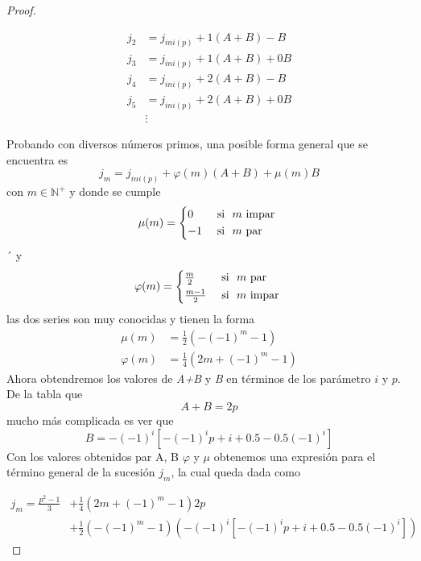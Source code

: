 \documentclass[10pt,letterpaper]{article}
\begin{document}
\begin{proof}
\begin{ejemplof2}[Caso p = 11]
\begin{align*}
	j_2 & =  j_{ini(p)} + 1(A  + B) - B  \\
	j_3 & =  j_{ini(p)} + 1(A + B) + 0B \\
	j_4 &=   j_{ini(p)} + 2(A + B) - B \\
	j_5 &=  j_{ini(p)}  + 2(A + B) + 0B  \\
	&\vdots 
\end{align*}
   	\end{ejemplof2}
  Probando con diversos números primos,  una posible forma general que se encuentra es
  \begin{equation}
  	j_m = j_{ini(p)} + \varphi(m)(A + B) + \mu(m) B
  \end{equation}
con $m \in \mathbb{N}^+$ y donde  se cumple 
\begin{equation*}
	\mu(m) = \begin{cases*}
		0 & \text{ si } $m$ impar \\
		-1 & \text{ si } $m$ par 
	\end{cases*}
\end{equation*}´
y 
\begin{equation*}
	\varphi(m) = \begin{cases*}
		\frac{m}{2} & \text{ si } $m$ par \\
		\frac{m - 1}{2} & \text{ si } $m$ impar 
	\end{cases*}
\end{equation*}
las dos series son muy conocidas y tienen la forma
\begin{align}
	\mu(m) &= \frac{1}{2}\left(-(-1)^m - 1 \right) \\
	\varphi(m) &= \frac{1}{4}\left( 2m + (-1)^m - 1 \right)  
\end{align}
  Ahora obtendremos los valores de \textit{A+B} y\textit{ B} en términos de los parámetro $i$ y $p$.\\
  De la tabla que
  \begin{equation}
  	A + B = 2p
  \end{equation}
mucho más complicada es ver que
\begin{equation}
	B = -(-1)^i[-(-1)^ip + i + 0.5 - 0.5(-1)^i] 
\end{equation}
 Con los valores obtenidos par A, B $\varphi$ y $\mu$ obtenemos una expresión para el término general de la sucesión $j_m$, la cual queda dada como
 
 \begin{equation} \label{ec:j_emesimo_elemento}
 \begin{split}
 	j_m  =  \frac{p^2 - 1}{3} &+ \frac{1}{4}\left( 2m + (-1)^m - 1 \right)2p  \\
 	&+  \frac{1}{2}\left(-(-1)^m - 1 \right)\left(-(-1)^i\left[-(-1)^ip + i + 0.5 - 0.5(-1)^i\right]\right)
 \end{split}
 \end{equation}



\end{proof}
\end{document}
